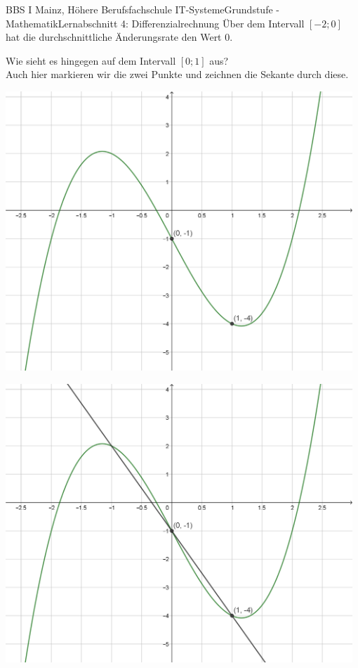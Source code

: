 \documentclass[11pt,twocolumn,oneside,openany,headings=optiontotoc,11pt,numbers=noenddot,final]{article}
\begin{document}
\begin{worksheet}{BBS I Mainz, Höhere Berufsfachschule IT-Systeme}{Grundstufe - Mathematik}{Lernabschnitt 4: Differenzialrechnung}
		Über dem Intervall \([-2;0]\) hat die durchschnittliche Änderungsrate den Wert \(0\).\\
		\par\noindent
		Wie sieht es hingegen auf dem Intervall \([0;1]\) aus?\\
		Auch hier markieren wir die zwei Punkte und zeichnen die Sekante durch diese.\\
		\par\noindent
		\begin{minipage}{0.2\textwidth}
			\includegraphics[width=0.98\textwidth,align=t]{../99_Bilder/04_Skr_DifQuo1.png}
		\end{minipage}
		\hfill
		\begin{minipage}{0.2\textwidth}
			\includegraphics[width=0.98\textwidth,align=t]{../99_Bilder/04_Skr_DifQuo1_G.png}

\end{minipage}
\end{worksheet}
\end{document}
